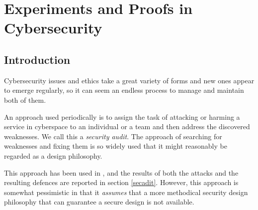 
\chapter{Experiments and Proofs in Cybersecurity }
\section{Introduction}
\thispagestyle{empty}
\pagestyle{empty}
% 
% 
% 
% 


Cybersecurity issues and ethics take a great variety of forms and new ones appear to emerge regularly, so it can seem an endless process to manage and maintain both of them\cite{josang2005user}. 

An approach used periodically is to assign the task of attacking or harming a service in cyberspace to an individual or a team and then address the discovered weaknesses. We call this a {\em security audit}. The approach of searching for weaknesses and fixing them is so widely used that it might reasonably be regarded as a design philosophy.

This approach has been used in \cite{sheniar2018experiments}, and the results of both the attacks and the resulting defences are reported in section \ref{secadit}. However, this approach is somewhat pessimistic in that it {\em assumes} that a more methodical security design philosophy that can guarantee a secure design is not available. 

